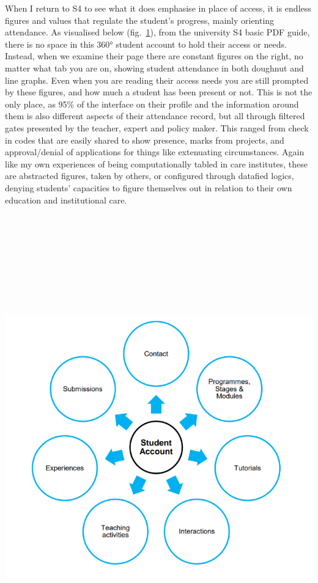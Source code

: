 When I return to S4 to see what it does emphasise in place of access, it
is endless figures and values that regulate the student's progress,
mainly orienting attendance. As visualised below
(fig.~\protect\hyperlink{fig:360}{1}), from the university S4 basic PDF
guide, there is no space in this 360° student account to hold their
access or needs. Instead, when we examine their page there are constant
figures on the right, no matter what tab you are on, showing student
attendance in both doughnut and line graphs. Even when you are reading
their access needs you are still prompted by these figures, and how much
a student has been present or not. This is not the only place, as 95\%
of the interface on their profile and the information around them is
also different aspects of their attendance record, but all through
filtered gates presented by the teacher, expert and policy maker. This
ranged from check in codes that are easily shared to show presence,
marks from projects, and approval/denial of applications for things like
extenuating circumstances. Again like my own experiences of being
computationally tabled in care institutes, these are abstracted figures,
taken by others, or configured through datafied logics, denying
students' capacities to figure themselves out in relation to their own
education and institutional care.

\includegraphics[width=9.23611in,height=7.90278in]{../../Chapters/media_02_Crip-Tic_of_Vignettes/Pictures/0.png}

